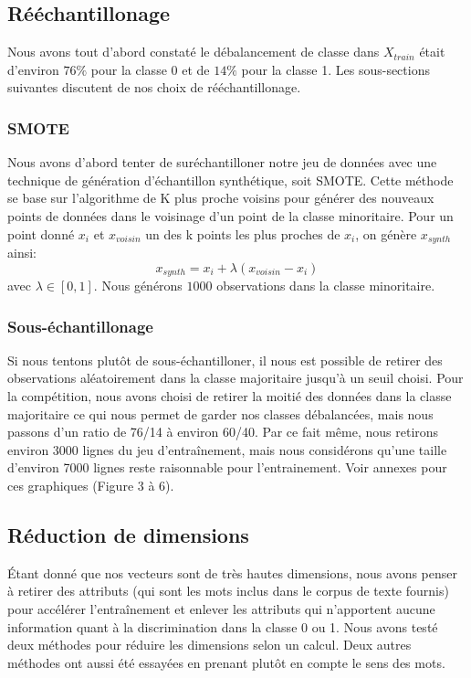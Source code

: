 \documentclass{article}
\begin{document}
\subsection{Rééchantillonage}
Nous avons tout d'abord constaté le débalancement de classe dans $X_{train}$ était d'environ $76\%$ pour la classe 0 et de $14\%$ pour la classe 1. Les sous-sections suivantes discutent de nos choix de rééchantillonage.
\subsubsection{SMOTE}
Nous avons d'abord tenter de suréchantilloner notre jeu de données avec une technique de génération d'échantillon synthétique, soit SMOTE. Cette méthode se base sur l'algorithme de K plus proche voisins pour générer des nouveaux points de données dans le voisinage d'un point de la classe minoritaire. Pour un point donné $x_i$ et $x_{voisin}$ un des k points les plus proches de $x_i$, on génère $x_{synth}$ ainsi:\\
$$x_{synth} = x_i + \lambda (x_{voisin} - x_i)$$ avec $\lambda \in [0, 1]$.
Nous générons $1000$ observations dans la classe minoritaire.
\subsubsection{Sous-échantillonage}
Si nous tentons plutôt de sous-échantilloner, il nous est possible de retirer des observations aléatoirement dans la classe majoritaire jusqu'à un seuil choisi. Pour la compétition, nous avons choisi de retirer la moitié des données dans la classe majoritaire ce qui nous permet de garder nos classes débalancées, mais nous passons d'un ratio de 76/14 à environ 60/40. Par ce fait même, nous retirons environ 3000 lignes du jeu d'entraînement, mais nous considérons qu'une taille d'environ 7000 lignes reste raisonnable pour l'entrainement. Voir annexes pour ces graphiques (Figure 3 à 6).
\subsection{Réduction de dimensions}
Étant donné que nos vecteurs sont de très hautes dimensions, nous avons penser à retirer des attributs (qui sont les mots inclus dans le corpus de texte fournis) pour accélérer l'entraînement et enlever les attributs qui n'apportent aucune information quant à la discrimination dans la classe 0 ou 1. Nous avons testé deux méthodes pour réduire les dimensions selon un calcul. Deux autres méthodes ont aussi été essayées en prenant plutôt en compte le sens des mots.
\end{document}
